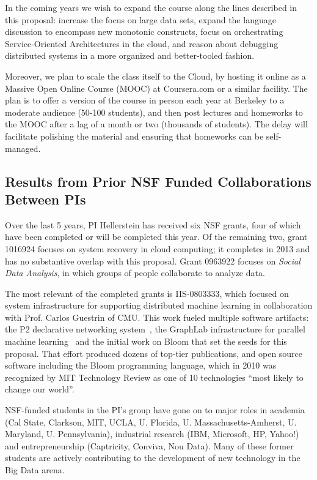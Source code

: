 In the coming years we wish to expand the course along the lines described in this proposal: increase the focus on large data sets, expand the language discussion to encompass new monotonic constructs, focus on orchestrating Service-Oriented Architectures in the cloud, and reason about debugging distributed systems in a more organized and better-tooled fashion.  

Moreover, we plan to scale the class itself to the Cloud, by hosting it online as a Massive Open Online Course (MOOC) at Coursera.com or a similar facility.  The plan is to offer a version of the course in person each year at Berkeley to a moderate audience (50-100 students), and then post lectures and homeworks to the MOOC after a lag of a month or two (thousands of students). The delay will facilitate polishing the material and ensuring that homeworks can be self-managed.

\subsection{Results from Prior NSF Funded Collaborations Between PIs}
\label{sec:prior}

Over the last 5 years, PI Hellerstein has received six NSF grants, four of which have been completed or will be completed this year.  Of the remaining two, grant 1016924 focuses on system recovery in cloud computing; it
completes in 2013 and has no substantive overlap with this
proposal. Grant 0963922 focuses on \emph{Social Data Analysis}, in which groups of people collaborate to analyze data. 

The most relevant of the completed grants is IIS-0803333, which focused on system infrastructure for supporting distributed machine learning in collaboration with Prof. Carlos Guestrin of CMU.  This work fueled multiple software artifacts: the P2 declarative networking system~\cite{p2}, the GraphLab infrastructure for parallel machine learning~\cite{graphlab} and the initial work on Bloom that set the seeds for this proposal.  That effort produced dozens of top-tier publications, and
open source software including the Bloom programming language,
which in 2010 was recognized by MIT Technology Review as one of 10
technologies ``most likely to change our world''.  

NSF-funded students in the PI's group have gone on to major roles in academia (Cal State, Clarkson, MIT, UCLA, U. Florida, U. Massachusetts-Amherst, U. Maryland, U. Pennsylvania), industrial research (IBM, Microsoft, HP, Yahoo!) and entrepreneurship (Captricity, Conviva, Nou Data).  Many of these former students are actively contributing to the development of new technology in the Big Data arena.

